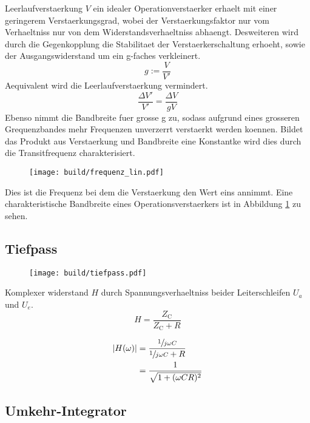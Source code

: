 Leerlaufverstaerkung $V$ ein idealer Operationverstaerker erhaelt mit einer
geringerem Verstaerkungsgrad, wobei der Verstaerkungsfaktor nur vom Verhaeltniss
nur von dem Widerstandsverhaeltniss abhaengt.
Desweiteren wird durch die Gegenkopplung die Stabilitaet der
Verstaerkerschaltung erhoeht, sowie der Ausgangswiderstand um ein g-faches
verkleinert.
\begin{equation}
		g := \frac{V}{V'}
\end{equation}
Aequivalent wird die Leerlaufverstaerkung vermindert.
\begin{equation}
		\frac{\Delta V'}{V'} = \frac{\Delta V}{g V}
\end{equation}
Ebenso nimmt die Bandbreite fuer grosse g zu, sodass aufgrund eines grosseren
Grequenzbandes mehr Frequenzen unverzerrt verstaerkt werden koennen.
Bildet das Produkt aus Verstaerkung und Bandbreite eine Konstantke wird dies
durch die Transitfrequenz charakterisiert.
\begin{figure}[h]
		\centering
		\texttt{[image: build/frequenz\_lin.pdf]}
		\caption{}
		\label{fig:freq}
\end{figure}
Dies ist die Frequenz bei dem die Verstaerkung den Wert eins annimmt.
Eine charakteristische Bandbreite eines Operationsverstaerkers ist in Abbildung
\ref{fig:freq} zu sehen.

\subsection{Tiefpass}%
\label{sub:tiefpass}

\begin{figure}[h]
		\centering
		\texttt{[image: build/tiefpass.pdf]}
		\caption{}
		\label{fig:}
\end{figure}

Komplexer widerstand $H$ durch Spannungsverhaeltniss beider Leiterschleifen
$U_a$ und $U_e$.
\begin{equation}
		\label{eq:blindwiederstand}
		H = \frac{Z_\text{C}}{Z_\text{C} + R} 
\end{equation}

\begin{align}
		\label{eq:h_betrag}
		\left| H(\omega) \right| &= \frac{\sfrac{1}{j \omega C}}{\sfrac{1}{j\omega
		C} + R}  \\
								 &= \frac{1}{\sqrt{1 + (\omega CR)^2}}
\end{align}


\subsection{Umkehr-Integrator}%
\label{sub:umkehr_integrator}


